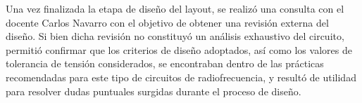 Una vez finalizada la etapa de diseño del layout, se realizó una consulta con el docente Carlos Navarro con el objetivo de obtener una revisión externa del diseño. Si bien dicha revisión no constituyó un análisis exhaustivo del circuito, permitió confirmar que los criterios de diseño adoptados, así como los valores de tolerancia de tensión considerados, se encontraban dentro de las prácticas recomendadas para este tipo de circuitos de radiofrecuencia, y resultó de utilidad para resolver dudas puntuales surgidas durante el proceso de diseño.